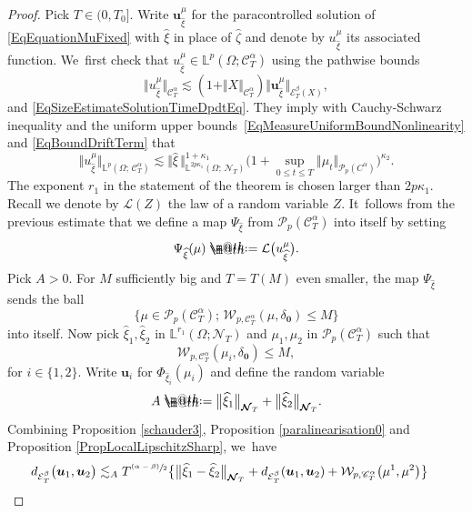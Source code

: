 \documentclass[10pt]{amsart}
\makeatletter
\newcommand{\psfrac}[2]{\sfrac{(#1)}{#2}}
\theoremstyle{definition}
\newcommand{\bfzero}{\mathbf{0}}
\newcommand{\mcE}{\mathcal{E}}
\newcommand{\mcL}{\mathcal{L}}
\newcommand{\mcN}{\mathcal{N}}
\newcommand{\mcP}{\mathcal{P}}
\newcommand\mcW{\mathcal W}
\newcommand{\bbL}{\mathbb{L}}
\newcommand{\bsu}{\boldsymbol{u}}
\newcommand{\scrC}{\ensuremath{\mathscr{C}}}
\newcommand*{\defeq}{\mathrel{\rlap{%
\raisebox{0.3ex}{$\m@th\cdot$}}%
\raisebox{-0.3ex}{$\m@th\cdot$}}%
=}
\newcommand{\dab}{\mcE^\beta_T}
\newcommand{\norme}[1]{\Vert #1 \Vert}
\makeatother
\begin{document}
\begin{proof}
Pick $T\in(0,T_0]$. Write $\bsu_{\widehat\xi}^{ \mu}$ for the paracontrolled solution of \eqref{EqEquationMuFixed} with $\widehat{\xi}$ in place of $\widehat{\zeta}$ and denote by $u^\mu_{\widehat\xi}$ its associated function. We~first check that $u^\mu_{\widehat\xi} \in \bbL^p(\Omega; \scrC^\alpha_T)$ using the pathwise bounds
\[
\norme{u^\mu_{\widehat\xi}}_{\scrC^\alpha_T} \lesssim (1+\norme{X}_{\scrC^\alpha_T})\norme{\bsu^\mu_{\widehat\xi}}_{\dab(X)},
\]
and \eqref{EqSizeEstimateSolutionTimeDpdtEq}. They imply with Cauchy-Schwarz inequality and the uniform upper bounds~\eqref{EqMeasureUniformBoundNonlinearity} and \eqref{EqBoundDriftTerm} that
\[
\Vert u^\mu_{\widehat\xi}\Vert_{\bbL^p(\Omega;\,\scrC^\alpha_T)}\lesssim \Vert \widehat{\xi} \, \Vert_{\bbL^{2p\kappa_1}(\Omega;\,{\boldsymbol{\mcN}}_T)}^{1+\kappa_1} \bigl(1+\sup_{0\leq t\leq T} \Vert \mu_t\Vert_{\mcP_p(C^\alpha)}\bigr)^{\kappa_2}.
\]
The exponent $r_1$ in the statement of the theorem is chosen larger than $2p\kappa_1$. Recall we denote by $\mcL(Z)$ the law of a random variable $Z$. It~follows from the previous estimate that we define a map $\Psi_{\widehat\xi}$ from $\mcP_p(\scrC^\alpha_T)$ into itself by setting
\[
\Psi_{\widehat\xi} (\mu) \defeq \mcL\bigl(u_{\widehat\xi}^{ \mu}\bigr).
\]
Pick $A>0$. For $M$ sufficiently big and $T=T(M)$ even smaller, the map $\Psi_{\widehat\xi}$ sends the ball
\[
\bigl\{ \mu \in \mcP_p(\scrC^\alpha_T);\, \mcW_{p,\scrC^\alpha_T}(\mu,\delta_\bfzero)\leq M\bigr\}
\]
into itself. Now pick $\widehat\xi_1, \widehat\xi_2$ in $\bbL^{r_1}(\Omega; {{\boldsymbol{\mcN}}_T})$ and $\mu_1, \mu_2$ in $\mcP_p(\scrC^\alpha_T)$ such that
\begin{equation} \label{EqBallCondition}
\mcW_{p,\scrC^\alpha_T}(\mu_i, \delta_\bfzero) \leq M,
\end{equation}
for $i\in\{1,2\}$. Write $\bsu_i$ for $\Phi_{\widehat\xi_i}(\mu_i)$ and define the random variable
\[
A \defeq \big\Vert \widehat\xi_1\big\Vert_{{{\boldsymbol{\mcN}}_T}} + \big\Vert \widehat\xi_2\big\Vert_{{{\boldsymbol{\mcN}}_T}}.
\]
Combining Proposition \ref{schauder3}, Proposition \ref{paralinearisation0} and Proposition \ref{PropLocalLipschitzSharp}, we~have
\begin{equation*} \begin{split}
d_{\mcE_T^\beta} \bigl(\bsu_1, \bsu_2\bigr) &\lesssim_A T^{\psfrac{\alpha-\beta}{2}} \bigl\{ \big\Vert \widehat\xi_1 - \widehat\xi_2\big\Vert_{{{\boldsymbol{\mcN}}_T}} + d_{\mcE^\beta_T}(\bsu_1, \bsu_2) + \mcW_{p,\scrC^\alpha_T}{\bigl({\mu}^1, {\mu}^2\bigr)} \bigr\}

\end{split}
\end{equation*}
\end{proof}
\end{document}
